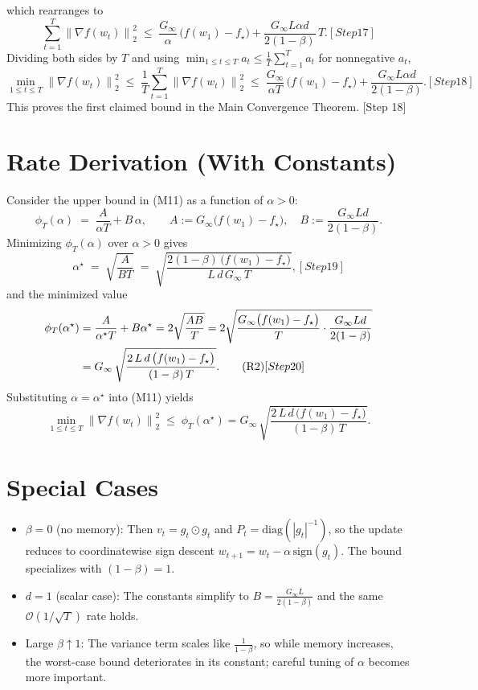 \documentclass[11pt]{article}
\newcommand{\diag}{\mathrm{diag}}
\newcommand{\norm}[1]{\left\lVert #1 \right\rVert}
\begin{document}
which rearranges to
\begin{equation}
\sum_{t=1}^T \norm{\nabla f(w_t)}_2^2
\;\le\;
\frac{G_\infty}{\alpha}\,\big(f(w_1)-f_\star\big)
+ \frac{G_\infty L \alpha d}{2(1-\beta)}\,T.
\tag{M10}[Step 17]
\end{equation}
Dividing both sides by $T$ and using $\min_{1\le t\le T} a_t \le \frac{1}{T}\sum_{t=1}^T a_t$ for nonnegative $a_t$,
\begin{equation}
\min_{1\le t\le T}\norm{\nabla f(w_t)}_2^2
\;\le\;
\frac{1}{T}\sum_{t=1}^T \norm{\nabla f(w_t)}_2^2
\;\le\;
\frac{G_\infty}{\alpha T}\,\big(f(w_1)-f_\star\big)
+ \frac{G_\infty L \alpha d}{2(1-\beta)}.
\tag{M11}[Step 18]
\end{equation}
This proves the first claimed bound in the Main Convergence Theorem. [Step 18]

\section*{Rate Derivation (With Constants)}
Consider the upper bound in (M11) as a function of $\alpha>0$:
\[
\phi_T(\alpha) \;=\; \frac{A}{\alpha T} + B\,\alpha,\qquad
A := G_\infty\big(f(w_1)-f_\star\big),\quad B := \frac{G_\infty L d}{2(1-\beta)}.
\]
Minimizing $\phi_T(\alpha)$ over $\alpha>0$ gives
\begin{equation}
\alpha^\star \;=\; \sqrt{\frac{A}{B T}} \;=\; \sqrt{\frac{2(1-\beta)\,\big(f(w_1)-f_\star\big)}{L\,d\,G_\infty\,T}},
\tag{R1}[Step 19]
\end{equation}
and the minimized value
\begin{align}
\phi_T(\alpha^\star)
&= \frac{A}{\alpha^\star T} + B \alpha^\star
= 2\sqrt{\frac{AB}{T}}
= 2\sqrt{\frac{G_\infty\big(f(w_1)-f_\star\big)}{T}\cdot \frac{G_\infty L d}{2(1-\beta)}}
\notag\\
&= G_\infty\,\sqrt{\frac{2\,L\,d\,\big(f(w_1)-f_\star\big)}{(1-\beta)\,T}}.
\tag{R2}[Step 20]
\end{align}
Substituting $\alpha=\alpha^\star$ into (M11) yields
\[
\min_{1\le t\le T}\norm{\nabla f(w_t)}_2^2 \;\le\; \phi_T(\alpha^\star)
= G_\infty\,\sqrt{\frac{2\,L\,d\,\big(f(w_1)-f_\star\big)}{(1-\beta)\,T}}.
\]

\section*{Special Cases}
\begin{itemize}
\item $\beta=0$ (no memory): Then $v_t = g_t\odot g_t$ and $P_t=\diag(|g_t|^{-1})$, so the update reduces to coordinatewise sign descent $w_{t+1}=w_t-\alpha\,\mathrm{sign}(g_t)$. The bound specializes with $(1-\beta)=1$.
\item $d=1$ (scalar case): The constants simplify to $B = \frac{G_\infty L}{2(1-\beta)}$ and the same $\mathcal{O}(1/\sqrt{T})$ rate holds.
\item Large $\beta\uparrow 1$: The variance term scales like $\frac{1}{1-\beta}$, so while memory increases, the worst-case bound deteriorates in its constant; careful tuning of $\alpha$ becomes more important.
\end{itemize}
\end{document}
